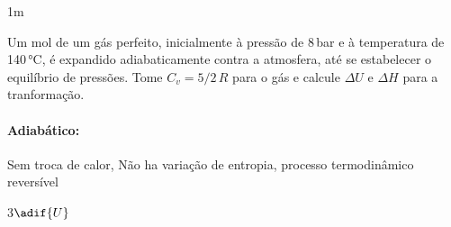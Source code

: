 \documentclass[\mainfilename]{subfiles}
\begin{document}
\begin{questionBox}1m{} %
    
    Um \unit{\mole} de um gás perfeito, inicialmente à pressão de 8\,\unit{\bar} e à temperatura de 140\,\unit{\celsius}, é expandido adiabaticamente contra a atmosfera, até se estabelecer o equilíbrio de pressões. Tome \(C_v = 5/2\,R\) para o gás e calcule \(\Delta U\) e \(\Delta H\) para a tranformação.

    \paragraph*{Adiabático:} Sem troca de calor, Não ha variação de entropia, processo termodinâmico reversível

    \begin{questionBox}3{\(\adif{U}\)} %
        

\end{questionBox}
\end{questionBox}
\end{document}

